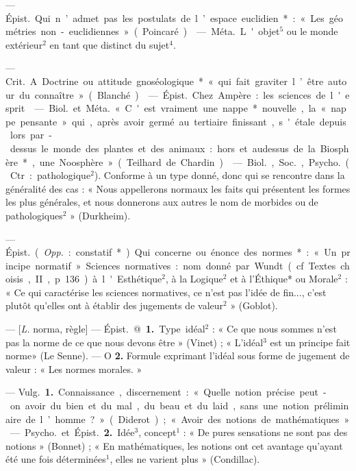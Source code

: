 \begin{itemize}[leftmargin=1cm, label=, itemsep=1pt]
 — \si{Épist.} Qui n’admet
pas les postulats de l’espace euclidien* : « Les géométries non-euclidiennes » (Poincaré).

 — \si{Méta.} L'objet$^5$ ou le
monde extérieur$^2$ en tant que distinct du sujet$^4$.

 — \si{Crit.} A. Doctrine ou
attitude gnoséologique* « qui fait
graviter l’être autour du connaître»
(Blanché).

 — \si{Épist.} Chez
Ampère : les sciences de l'esprit.

 — \si{Biol.} et \si{Méta.} « C'est
vraiment une nappe* nouvelle, la
« nappe pensante » qui, après avoir
germé au tertiaire finissant, s'étale
depuis lors par-dessus le monde des
plantes et des animaux : hors et audessus de la Biosphère*, une Noosphère » (Teilhard de Chardin).

 — \si{Biol.}, \si{Soc.}, \si{Psycho.} (Ctr. :
pathologique$^2$). Conforme à un type
donné, donc qui se rencontre dans
la généralité des cas : « Nous appellerons normaux les faits qui présentent les formes les plus générales,
et nous donnerons aux autres le
nom de morbides ou de pathologiques$^2$ » (Durkheim).

 — \si{Épist.} ({\it Opp.} : constatif*)
Qui concerne ou énonce des normes*:
« Un principe normatif ». Sciences
normatives : nom donné par Wundt
(cf. Textes choisis, II, p. 136) à
l'Esthétique$^2$, à la Logique$^2$ et à
l'Éthique* ou Morale$^2$ : « Ce qui
caractérise les sciences normatives,
ce n’est pas l'idée de fin..., c’est
plutôt qu’elles ont à établir des jugements de valeur$^2$ » (Goblot).

 — [{\it L.} norma, règle] — \si{Épist.}
@ {\bf 1.} Type idéal$^2$ : « Ce que nous
sommes n’est pas la norme de ce
que nous devons être » (Vinet) ;
« L'idéal$^3$ est un principe fait norme»
(Le Senne). — O {\bf 2.} Formule exprimant l'idéal sous forme de jugement de valeur : « Les normes morales. »

 — \si{Vulg.} {\bf 1.} Connaissance, discernement : « Quelle notion précise
peut-on avoir du bien et du mal,
du beau et du laid, ... sans une notion préliminaire de l’homme ? »
(Diderot) ; « Avoir des notions de
mathématiques. »

— \si{Psycho.} et \si{Épist.} {\bf 2.} Idée$^3$,
concept$^1$ : « De pures sensations ne
sont pas des notions » (Bonnet) ;
« En mathématiques, les notions
ont cet avantage qu'ayant été une
fois déterminées$^1$, elles ne varient
plus » (Condillac).


\end{itemize}
